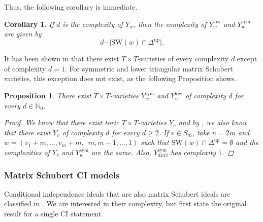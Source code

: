 \documentclass[11pt]{amsart}
\newtheorem{proposition}[theorem]{Proposition}
\newtheorem{corollary}[theorem]{Corollary}
\theoremstyle{definition}
\theoremstyle{definition}
\theoremstyle{definition}
\theoremstyle{definition}
\newcommand{\SW}{\mathrm{SW}}
\newcommand{\sym}{\mathrm{sym}}
\newcommand{\low}{\mathrm{low}}
\begin{document}
\noindent Thus, the following corollary is immediate. 

\begin{corollary}
If $d$ is the complexity of $Y_w$, then the complexity of $Y^{\textrm{low}}_w$ and $Y^{\textrm{sym}}_w$ are given by $$d- \vert \SW(w)\cap\Delta^{\textrm{up}}\vert.$$
\end{corollary}

\noindent It has been shown in \cite[Theorem 3.14, Theorem 3.15]{donten2021complexity} that there exist $T \times T$-varieties of every complexity $d$ except of complexity $d=1$. For symmetric and lower triangular matrix Schubert varieties, this exception does not exist, as the following Proposition shows.


\begin{proposition}
There exist $T \times T$-varieties $Y_w^{\sym}$ and $Y_w^{\low}$ of complexity $d$ for every $d\in \mathbb N_0$.
\begin{proof}
We know that there exist toric $T \times T$-varieties $Y_{v}$ and
by \cite[Theorem 3.15]{donten2021complexity}, we also know that there exist $Y_{v}$ of complexity $d$ for every $d \geq 2$. If $v \in S_{ m}$, take $n=2m$ and $w = (v_1 + m, \ldots , v_m+m, \,\,\, m, m-1, \ldots, 1)$ such that $\SW(w) \cap \Delta^{\textrm{up}} = \emptyset$ and the complexities of $Y_{v}$ and $Y_w^{\sym}$ are the same. Also, 
$Y^{\sym}_{3412}$ has complexity $1$.
\end{proof}
\end{proposition}


\subsubsection{Matrix Schubert CI models}

Conditional independence ideals that are also matrix Schubert ideals are classified in \cite{fink2016matrix}. We are interested in their complexity, but first state the original result for a single CI statement.
\end{document}
